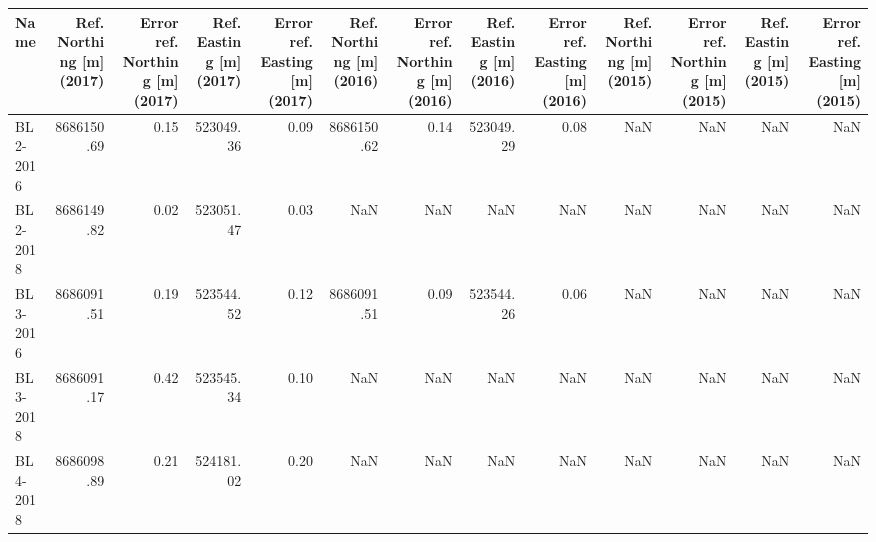 \begin{tabular}{lrrrrrrrrrrrr}
\toprule
        Name &  Ref. Northing [m] (2017) &  Error ref. Northing [m] (2017) &  Ref. Easting [m] (2017) &  Error ref. Easting [m] (2017) &  Ref. Northing [m] (2016) &  Error ref. Northing [m] (2016) &  Ref. Easting [m] (2016) &  Error ref. Easting [m] (2016) &  Ref. Northing [m] (2015) &  Error ref. Northing [m] (2015) &  Ref. Easting [m] (2015) &  Error ref. Easting [m] (2015) \\
\midrule
    BL2-2016 &                8686150.69 &                            0.15 &                523049.36 &                           0.09 &                8686150.62 &                            0.14 &                523049.29 &                           0.08 &                       NaN &                             NaN &                      NaN &                            NaN \\
    BL2-2018 &                8686149.82 &                            0.02 &                523051.47 &                           0.03 &                       NaN &                             NaN &                      NaN &                            NaN &                       NaN &                             NaN &                      NaN &                            NaN \\
    BL3-2016 &                8686091.51 &                            0.19 &                523544.52 &                           0.12 &                8686091.51 &                            0.09 &                523544.26 &                           0.06 &                       NaN &                             NaN &                      NaN &                            NaN \\
    BL3-2018 &                8686091.17 &                            0.42 &                523545.34 &                           0.10 &                       NaN &                             NaN &                      NaN &                            NaN &                       NaN &                             NaN &                      NaN &                            NaN \\
    BL4-2018 &                8686098.89 &                            0.21 &                524181.02 &                           0.20 &                       NaN &                             NaN &                      NaN &                            NaN &                       NaN &                             NaN &                      NaN &                            NaN \\

\end{tabular}
